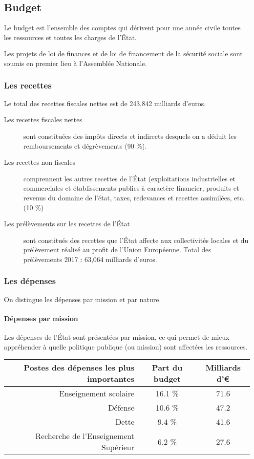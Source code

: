 \documentclass[10pt,a4paper,french]{article}
\begin{document}
\subsection{Budget}
Le budget est l’ensemble des comptes qui dérivent pour une année civile toutes les ressources et toutes
les charges de l’État.

Les projets de loi de finances et de loi de financement de la sécurité sociale sont soumis en premier lieu à
l’Assemblée Nationale.

\subsubsection{Les recettes}
Le total des recettes fiscales nettes est de 243,842 milliards d’euros.
\begin{description}
\item[Les recettes fiscales nettes] sont constituées des impôts directs et indirects desquels on a déduit les remboursements et dégrèvements (90 \%).
\item[Les recettes non fiscales]comprennent les autres recettes de l’État (exploitations industrielles et
commerciales et établissements publics à caractère financier, produits et revenus du domaine de
l’état, taxes, redevances et recettes assimilées, etc. (10 \%)
\item[Les prélèvements sur les recettes de l'État] sont constitués des recettes que l’État affecte aux collectivités locales et du prélèvement réalisé au profit de l’Union Européenne. Total des prélèvements 2017 : 63,064 milliards d’euros.
\end{description}

\subsubsection{Les dépenses}
On distingue les dépenses par mission et par nature.

\paragraph{Dépenses par mission}
Les dépenses de l'État sont présentées par mission, ce qui permet de mieux appréhender à quelle politique publique (ou mission) sont affectées les ressources.

\begin{table}[h]
\centering
\begin{tabular}{r|cc}
Postes des dépenses les plus importantes & Part du budget & Milliards d'\euro \\
\hline
Enseignement scolaire & 16.1 \% & 71.6 \\
Défense & 10.6 \% & 47.2 \\
Dette & 9.4 \% & 41.6 \\
Recherche de l'Enseignement Supérieur & 6.2 \% & 27.6
\end{tabular}
\end{table}
\end{document}
